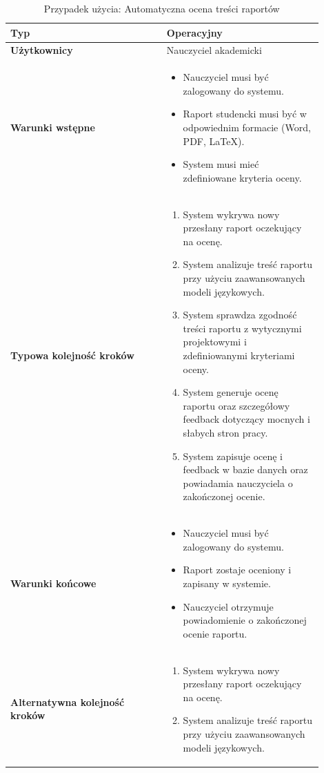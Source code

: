 \documentclass[a4paper, 12pt]{article}
\begin{document}
\footnotesize
\begin{center}
\begin{longtable}{|p{0.45\linewidth}|p{0.45\linewidth}|}
\caption{Przypadek użycia: Automatyczna ocena treści raportów} \\
\hline
\textbf{Typ} & Operacyjny \\
\hline
\textbf{Użytkownicy} & Nauczyciel akademicki \\
\hline
\textbf{Warunki wstępne} &
\begin{itemize}
    \item Nauczyciel musi być zalogowany do systemu.
    \item Raport studencki musi być w odpowiednim formacie (Word, PDF, LaTeX).
    \item System musi mieć zdefiniowane kryteria oceny.
\end{itemize} \\
\hline
\textbf{Typowa kolejność kroków} &
\begin{enumerate}
    \item System wykrywa nowy przesłany raport oczekujący na ocenę.
    \item System analizuje treść raportu przy użyciu zaawansowanych modeli językowych.
    \item System sprawdza zgodność treści raportu z wytycznymi projektowymi i zdefiniowanymi kryteriami oceny.
    \item System generuje ocenę raportu oraz szczegółowy feedback dotyczący mocnych i słabych stron pracy.
    \item System zapisuje ocenę i feedback w bazie danych oraz powiadamia nauczyciela o zakończonej ocenie.
\end{enumerate} \\
\hline
\textbf{Warunki końcowe} &
\begin{itemize}
    \item Nauczyciel musi być zalogowany do systemu.
    \item Raport zostaje oceniony i zapisany w systemie.
    \item Nauczyciel otrzymuje powiadomienie o zakończonej ocenie raportu.
\end{itemize} \\
\hline
\textbf{Alternatywna kolejność kroków} &
\begin{enumerate}
    \item System wykrywa nowy przesłany raport oczekujący na ocenę.
    \item System analizuje treść raportu przy użyciu zaawansowanych modeli językowych.

\end{enumerate}
\end{longtable}
\end{center}
\end{document}

